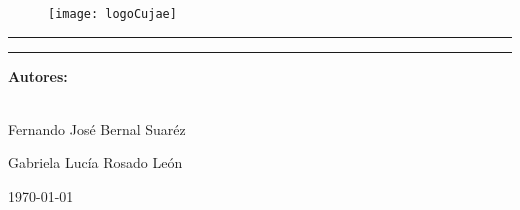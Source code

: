 \begin{titlepage}
	\centering %
	
	\begin{figure}[h]
		\centering
		\texttt{[image: logoCujae]} %
	\end{figure}
	
	{\LARGE \textbf{\university}\par}
	
	\vspace{0.4cm} %
	
	{\Large \faculty \par}
	\vspace{1cm} %
	
	\rule{\textwidth}{1pt} %
	
	\vspace{0.2cm} %
	
	{\Huge\bfseries \getTitle\par}
	
	\vspace{0.2cm} %
	
	\rule{\textwidth}{1pt} %
	
	{\Large \documentName \par}
	\vspace{1.0cm} %
	
	{\Large\bfseries Autores: \\[0.3cm]
		\getAuthor \\[0.2cm]\par
		
		Fernando José Bernal Suaréz\par
		
		Gabriela Lucía Rosado León\par
	
	}
	
	\vspace{0.5cm} %
	\vspace{0.5cm} %
	
	{\large \today\par} %
	
	\vfill %
	
	\enlargethispage{0.5cm} %
\end{titlepage}